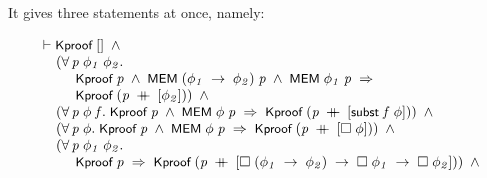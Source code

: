 \documentclass{report}
\renewcommand{\HOLConst}[1]{{\textsf{\upshape\small #1}}}
\newenvironment{holmath}{\begin{displaymath}\begin{array}{l}}{\end{array}\end{displaymath}\ignorespacesafterend}
\begin{document}
It gives three statements at once, namely:

\begin{holmath}
  \ensuremath{\HOLTokenTurnstile}\HOLConst{Kproof}\;[]\;\HOLSymConst{\HOLTokenConj{}}\\
\;\;\;\;\;(\HOLSymConst{\HOLTokenForall{}}\HOLBoundVar{p}\;\HOLBoundVar{\ensuremath{\phi\sb{1}}}\;\HOLBoundVar{\ensuremath{\phi\sb{2}}}.\\
\;\;\;\;\;\;\;\;\;\;\HOLConst{Kproof}\;\HOLBoundVar{p}\;\HOLSymConst{\HOLTokenConj{}}\;\HOLConst{MEM}\;(\HOLBoundVar{\ensuremath{\phi\sb{1}}}\;\HOLSymConst{\ensuremath{\rightarrow}}\;\HOLBoundVar{\ensuremath{\phi\sb{2}}})\;\HOLBoundVar{p}\;\HOLSymConst{\HOLTokenConj{}}\;\HOLConst{MEM}\;\HOLBoundVar{\ensuremath{\phi\sb{1}}}\;\HOLBoundVar{p}\;\HOLSymConst{\HOLTokenImp{}}\\
\;\;\;\;\;\;\;\;\;\;\HOLConst{Kproof}\;(\HOLBoundVar{p}\;\HOLSymConst{\HOLTokenDoublePlus}\;[\HOLBoundVar{\ensuremath{\phi\sb{2}}}]))\;\HOLSymConst{\HOLTokenConj{}}\\
\;\;\;\;\;(\HOLSymConst{\HOLTokenForall{}}\HOLBoundVar{p}\;\HOLBoundVar{\ensuremath{\phi}}\;\HOLBoundVar{f}.\;\HOLConst{Kproof}\;\HOLBoundVar{p}\;\HOLSymConst{\HOLTokenConj{}}\;\HOLConst{MEM}\;\HOLBoundVar{\ensuremath{\phi}}\;\HOLBoundVar{p}\;\HOLSymConst{\HOLTokenImp{}}\;\HOLConst{Kproof}\;(\HOLBoundVar{p}\;\HOLSymConst{\HOLTokenDoublePlus}\;[\HOLConst{subst}\;\HOLBoundVar{f}\;\HOLBoundVar{\ensuremath{\phi}}]))\;\HOLSymConst{\HOLTokenConj{}}\\
\;\;\;\;\;(\HOLSymConst{\HOLTokenForall{}}\HOLBoundVar{p}\;\HOLBoundVar{\ensuremath{\phi}}.\;\HOLConst{Kproof}\;\HOLBoundVar{p}\;\HOLSymConst{\HOLTokenConj{}}\;\HOLConst{MEM}\;\HOLBoundVar{\ensuremath{\phi}}\;\HOLBoundVar{p}\;\HOLSymConst{\HOLTokenImp{}}\;\HOLConst{Kproof}\;(\HOLBoundVar{p}\;\HOLSymConst{\HOLTokenDoublePlus}\;[\HOLSymConst{\ensuremath{\Box}}\;\HOLBoundVar{\ensuremath{\phi}}]))\;\HOLSymConst{\HOLTokenConj{}}\\
\;\;\;\;\;(\HOLSymConst{\HOLTokenForall{}}\HOLBoundVar{p}\;\HOLBoundVar{\ensuremath{\phi\sb{1}}}\;\HOLBoundVar{\ensuremath{\phi\sb{2}}}.\\
\;\;\;\;\;\;\;\;\;\;\HOLConst{Kproof}\;\HOLBoundVar{p}\;\HOLSymConst{\HOLTokenImp{}}\;\HOLConst{Kproof}\;(\HOLBoundVar{p}\;\HOLSymConst{\HOLTokenDoublePlus}\;[\HOLSymConst{\ensuremath{\Box}}\;(\HOLBoundVar{\ensuremath{\phi\sb{1}}}\;\HOLSymConst{\ensuremath{\rightarrow}}\;\HOLBoundVar{\ensuremath{\phi\sb{2}}})\;\HOLSymConst{\ensuremath{\rightarrow}}\;\HOLSymConst{\ensuremath{\Box}}\;\HOLBoundVar{\ensuremath{\phi\sb{1}}}\;\HOLSymConst{\ensuremath{\rightarrow}}\;\HOLSymConst{\ensuremath{\Box}}\;\HOLBoundVar{\ensuremath{\phi\sb{2}}}]))\;\HOLSymConst{\HOLTokenConj{}}\\

\end{holmath}
\end{document}
